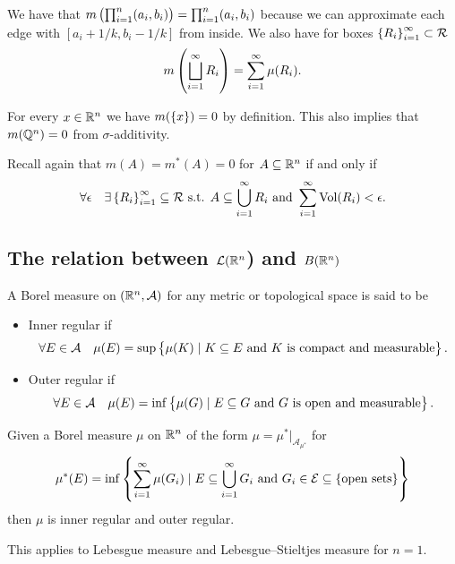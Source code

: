 \documentclass[11pt,a4paper]{article}
\newcommand{\A}{\mathcal A}
\begin{document}

\begin{remark}
  We have that $m\del{\prod_{i=1}^{n}(a_i,b_i)} = \prod_{i=1}^{n}(a_i,b_i)$
  because we can approximate each edge with $[a_i + 1/k, b_i - 1/k]$ from
  inside.
  We also have for boxes $\left\{R_i\right\}_{i=1}^{\infty} \subset \mathcal R$
  \[
    m\del{\bigsqcup_{i=1}^{\infty} R_i} =
    \sum_{i=1}^{\infty} \mu(R_i).
  \]
\end{remark}

\begin{remark}
  For every $x \in \mathbb{R}^n$ we have $m(\left\{x\right\}) = 0$ by definition.
  This also implies that $m(\mathbb{Q}^n) = 0$ from $\sigma$-additivity.
\end{remark}

\begin{remark}
  Recall again that $m(A) = m^*(A) = 0$ for $A \subseteq \mathbb{R}^n$
  if and only if
  \[
    \forall \epsilon \quad \exists \left\{R_i\right\}_{i=1}^{\infty} \subseteq \mathcal R
    \text{ s.t. }
    A \subseteq \bigcup_{i=1}^{\infty} R_i \text{ and }
    \sum_{i=1}^{\infty} \operatorname{Vol}(R_i) < \epsilon.
  \]
\end{remark}

\subsection{The relation between \texorpdfstring{$\mathcal{L}(\mathbb{R}^n$)}{L} and
  \texorpdfstring{$B(\mathbb{R}^n)$}{B}}
\begin{definition}
  A Borel measure on $(\R^n, \A)$ for any metric or topological space
  is said to be
  \begin{itemize}
    \item Inner regular if
      \[
        \forall E \in \A \quad
        \mu(E) = \sup\set{\mu(K) \mid
          K \subseteq E \stand \text{$K$ is compact and measurable}}.
      \]
    \item Outer regular if
      \[
        \forall E \in \A \quad
        \mu(E) = \inf\set{\mu(G) \mid
          E \subseteq G \stand \text{$G$ is open and measurable}}.
      \]
  \end{itemize}
\end{definition}

\begin{proposition}
  \label{prp:implies-regular}
  Given a Borel measure $\mu$ on $\mathbb{R}^n$ of the form
  $\mu = \mu^*\vert_{\A_{\mu^*}}$ for
  \[
    \mu^*(E) = \inf\left\{\sum_{i=1}^{\infty} \mu(G_i) \mid E \subseteq
    \bigcup_{i=1}^{\infty} G_i \text{ and } G_i \in \mathcal{E} \subseteq
    \left\{\text{open sets}\right\}\right\}
  \]
  then $\mu$ is inner regular and outer regular.
\end{proposition}
\begin{remark}
  This applies to Lebesgue measure and Lebesgue--Stieltjes measure for $n = 1$.
\end{remark}
\end{document}
